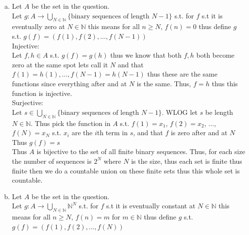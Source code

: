 \documentclass[12pt, letterpaper]{article}
\theoremstyle{definition}
\newcommand{\N}{\mathbb{N}}
\begin{document}
\begin{enumerate}[(a)]
    Let $s=(x_1,x_2,\dots)$ be a infinite binary sequence. Thus pick the function $f$ in $A$ s.t. $f(1)=x_1, f(2)=x_2,\dots$ thus $g(f)=s$\\
    Thus $g$ is bijective.\\
    Now assume for contradiction that the set of infinite binary sequences is countable. Thus, we can list them $s_1,s_2,\dots$\\
    Now define the sequence $t$ s.t. $t(n)=1$ if $s_n$ at the $n$th term is $0$ and $0$ if the $n$th term is $1$.\\
    $t$ cannot be in our list because if it were lets say it was $s_m$ but at the $m$th spot we flipped it in $t$ thus this is a contradiction.\\
    Thus, $A$ is not countable.
    \item Let $A$ be the set in the question.\\
    Let $g: A \to \bigcup_{N \in \N}\{\text{binary sequences of length $N-1$}\}$ s.t. for $f$ s.t it is eventually zero at $N\in \N$ this means for all $n \geq N$, $f(n)=0$
    thus define $g$ s.t. $g(f)=(f(1),f(2),\dots,f(N-1))$\\
    Injective:\\
    Let $f,h \in A$ s.t. $g(f)=g(h)$ thus we know that both $f,h$ both become zero at the same spot lets call it $N$ and that $f(1)=h(1),\dots,f(N-1)=h(N-1)$ thus these are the same functions since everything after and at $N$ is the same.
    Thus, $f=h$ thus this function is injective.\\
    Surjective:\\
    Let $s \in \bigcup_{N \in \N}\{\text{binary sequences of length $N-1$}\}$. WLOG let $s$ be length $N \in \N$. Thus pick the function in $A$ s.t. $f(1)=x_1$, $f(2)=x_2$, $\dots$, $f(N)=x_N$ s.t. $x_i$ are the $i$th term in $s$, and that $f$ is zero after and at $N$\\
    Thus $g(f)=s$\\
    Thus $A$ is bijective to the set of all finite binary sequences. Thus, for each size the number of sequences is $2^N$ where $N$ is the size, thus each set is finite thus finite then we do a countable union on these finite sets thus this whole set is countable.
    \item Let $A$ be the set in the question.\\
    Let $g: A \to \bigcup_{N \in \N}\N^N$ s.t. for $f$ s.t it is eventually constant at $N\in \N$ this means for all $n \geq N$, $f(n)=m$ for $m \in \N$
    thus define $g$ s.t. $g(f)=(f(1),f(2),\dots,f(N))$\\

\end{enumerate}
\end{document}
